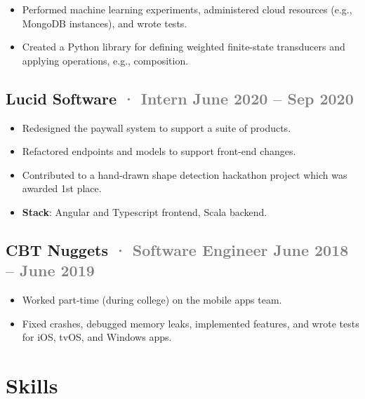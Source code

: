 \documentclass[12pt]{article} %
\providecommand{\tightlist}{%
  \setlength{\itemsep}{0pt}\setlength{\parskip}{0pt}}
\renewcommand{\emph}[1]{%
  \textcolor{gray}{#1}%
}
\begin{document}
\begin{paracol}{2}
\begin{raggedright}
\begin{itemize}
\tightlist
\item
  Performed machine learning experiments, administered cloud resources
  (e.g., MongoDB instances), and wrote tests.
\item
  Created a Python library for defining weighted finite-state
  transducers and applying operations, e.g., composition.
\end{itemize}

\hypertarget{lucid-software-intern-june-2020-sep-2020}{%
\subsection{\texorpdfstring{Lucid Software \emph{· \small Intern
\hfill June 2020 -- Sep
2020}}{Lucid Software · Intern June 2020 -- Sep 2020}}\label{lucid-software-intern-june-2020-sep-2020}}

\begin{itemize}
\tightlist
\item
  Redesigned the paywall system to support a suite of products.
\item
  Refactored endpoints and models to support front-end changes.
\item
  Contributed to a hand-drawn shape detection hackathon project which
  was awarded 1st place.
\item
  \textbf{Stack}: Angular and Typescript frontend, Scala backend.
\end{itemize}

\hypertarget{cbt-nuggets-software-engineer-june-2018-june-2019}{%
\subsection{\texorpdfstring{CBT Nuggets \emph{· \small Software Engineer
\hfill June 2018 -- June
2019}}{CBT Nuggets · Software Engineer June 2018 -- June 2019}}\label{cbt-nuggets-software-engineer-june-2018-june-2019}}

\begin{itemize}
\tightlist
\item
  Worked part-time (during college) on the mobile apps team.
\item
  Fixed crashes, debugged memory leaks, implemented features, and wrote
  tests for iOS, tvOS, and Windows apps.
\end{itemize}

\switchcolumn 

\hypertarget{skills}{%
\section{Skills}\label{skills}}


\end{raggedright}
\end{paracol}
\end{document}
